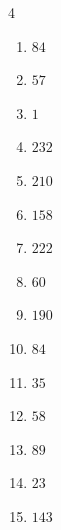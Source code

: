 \begin{multicols}{4}
\begin{enumerate}

  \item $84$


  \item $57$


  \item $1$


  \item $232$


\columnbreak %

\resetques

  \item $210$


  \item $158$


  \item $222$


  \item $60$


  \item $190$


  \item $84$


  \item $35$


  \item $58$


  \item $89$


  \item $23$


  \item $143$


\end{enumerate}
\end{multicols}
